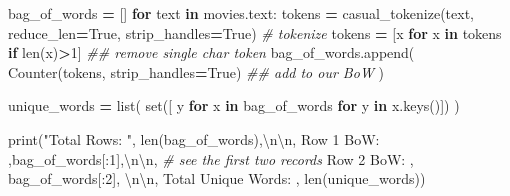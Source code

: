 \documentclass[
]{book}
\newenvironment{Shaded}{\begin{snugshade}}{\end{snugshade}}
\newcommand{\BuiltInTok}[1]{#1}
\newcommand{\CharTok}[1]{\textcolor[rgb]{0.5,0.5,0.5}{#1}}
\newcommand{\CommentTok}[1]{\textcolor[rgb]{0.37,0.37,0.37}{\textit{#1}}}
\newcommand{\ControlFlowTok}[1]{\textcolor[rgb]{0.27,0.27,0.27}{\textbf{#1}}}
\newcommand{\DecValTok}[1]{\textcolor[rgb]{0.06,0.06,0.06}{#1}}
\newcommand{\KeywordTok}[1]{\textcolor[rgb]{0.27,0.27,0.27}{\textbf{#1}}}
\newcommand{\NormalTok}[1]{#1}
\newcommand{\OperatorTok}[1]{\textcolor[rgb]{0.43,0.43,0.43}{\textbf{#1}}}
\newcommand{\StringTok}[1]{\textcolor[rgb]{0.5,0.5,0.5}{#1}}
\newcommand{\VariableTok}[1]{\textcolor[rgb]{0,0,0}{#1}}
\begin{document}
\begin{Shaded}
\begin{Highlighting}[]
\NormalTok{bag\_of\_words }\OperatorTok{=}\NormalTok{ []}
\ControlFlowTok{for}\NormalTok{ text }\KeywordTok{in}\NormalTok{ movies.text:}
\NormalTok{    tokens }\OperatorTok{=}\NormalTok{ casual\_tokenize(text, reduce\_len}\OperatorTok{=}\VariableTok{True}\NormalTok{, strip\_handles}\OperatorTok{=}\VariableTok{True}\NormalTok{)  }\CommentTok{\# tokenize}
\NormalTok{    tokens }\OperatorTok{=}\NormalTok{ [x }\ControlFlowTok{for}\NormalTok{ x }\KeywordTok{in}\NormalTok{ tokens }\ControlFlowTok{if} \BuiltInTok{len}\NormalTok{(x)}\OperatorTok{\textgreater{}}\DecValTok{1}\NormalTok{]                  }\CommentTok{\#\# remove single char token}
\NormalTok{    bag\_of\_words.append( Counter(tokens, strip\_handles}\OperatorTok{=}\VariableTok{True}\NormalTok{)  }\CommentTok{\#\# add to our BoW}
\NormalTok{    )}

\NormalTok{unique\_words }\OperatorTok{=}  \BuiltInTok{list}\NormalTok{( }\BuiltInTok{set}\NormalTok{([ y  }\ControlFlowTok{for}\NormalTok{ x }\KeywordTok{in}\NormalTok{ bag\_of\_words  }\ControlFlowTok{for}\NormalTok{ y }\KeywordTok{in}\NormalTok{ x.keys()]) )}

\BuiltInTok{print}\NormalTok{(}\StringTok{"Total Rows: "}\NormalTok{, }\BuiltInTok{len}\NormalTok{(bag\_of\_words),}\StringTok{\textquotesingle{}}\CharTok{\textbackslash{}n\textbackslash{}n}\StringTok{\textquotesingle{}}\NormalTok{,}
      \StringTok{\textquotesingle{}Row 1 BoW: \textquotesingle{}}\NormalTok{,bag\_of\_words[:}\DecValTok{1}\NormalTok{],}\StringTok{\textquotesingle{}}\CharTok{\textbackslash{}n\textbackslash{}n}\StringTok{\textquotesingle{}}\NormalTok{,    }\CommentTok{\# see the first two records}
      \StringTok{\textquotesingle{}Row 2 BoW: \textquotesingle{}}\NormalTok{, bag\_of\_words[:}\DecValTok{2}\NormalTok{], }\StringTok{\textquotesingle{}}\CharTok{\textbackslash{}n\textbackslash{}n}\StringTok{\textquotesingle{}}\NormalTok{,}
      \StringTok{\textquotesingle{}Total Unique Words: \textquotesingle{}}\NormalTok{, }\BuiltInTok{len}\NormalTok{(unique\_words))}
\end{Highlighting}
\end{Shaded}
\end{document}
